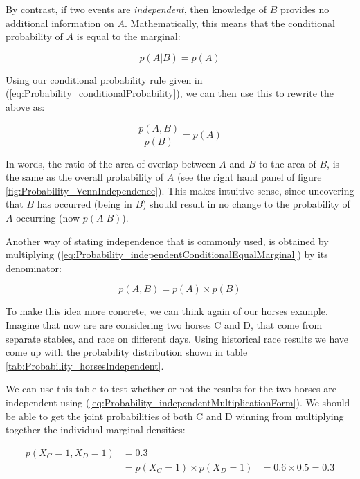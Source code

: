 \documentclass[11pt,fullpage]{book}
\begin{document}
By contrast, if two events are \textit{independent}, then knowledge of $B$ provides no additional information on $A$. Mathematically, this means that the conditional probability of $A$ is equal to the marginal:

\begin{equation}\label{eq:Probability_independentConditionalEqualMarginal}
p(A|B) = p(A)
\end{equation}

Using our conditional probability rule given in (\ref{eq:Probability_conditionalProbability}), we can then use this to rewrite the above as:

\begin{equation}\label{eq:Probability_independentConditionalEqualMarginal1}
\frac{p(A,B)}{p(B)} = p(A)
\end{equation}

In words, the ratio of the area of overlap between $A$ and $B$ to the area of $B$, is the same as the overall probability of $A$ (see the right hand panel of figure \ref{fig:Probability_VennIndependence}). This makes intuitive sense, since uncovering that $B$ has occurred (being in $B$) should result in no change to the probability of $A$ occurring (now $p(A|B)$).

Another way of stating independence that is commonly used, is obtained by multiplying (\ref{eq:Probability_independentConditionalEqualMarginal}) by its denominator:

\begin{equation}\label{eq:Probability_independentMultiplicationForm}
p(A,B) = p(A)\times p(B)
\end{equation}

To make this idea more concrete, we can think again of our horses example. Imagine that now are are considering two horses C and D, that come from separate stables, and race on different days. Using historical race results we have come up with the probability distribution shown in table \ref{tab:Probability_horsesIndependent}. 

We can use this table to test whether or not the results for the two horses are independent using (\ref{eq:Probability_independentMultiplicationForm}). We should be able to get the joint probabilities of both C and D winning from multiplying together the individual marginal densities:

\begin{equation}
\begin{align}
p(X_C=1,X_D=1) &= 0.3\\
&= p(X_C=1) \times p(X_D=1) 
&= 0.6 \times 0.5 = 0.3
\end{align}
\end{equation}
\end{document}
